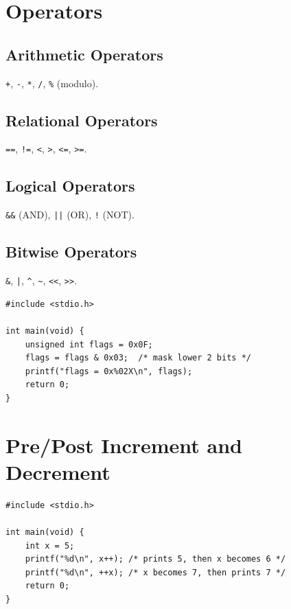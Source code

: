 \documentclass[11pt,a4paper]{article}
\begin{document}
\section{Operators}
\subsection{Arithmetic Operators}
\texttt{+}, \texttt{-}, \texttt{*}, \texttt{/}, \texttt{\%} (modulo).

\subsection{Relational Operators}
\texttt{==}, \texttt{!=}, \texttt{<}, \texttt{>}, \texttt{<=}, \texttt{>=}.

\subsection{Logical Operators}
\texttt{\&\&} (AND), \texttt{||} (OR), \texttt{!} (NOT).

\subsection{Bitwise Operators}
\texttt{\&}, \texttt{|}, \texttt{\^}, \texttt{\~}, \texttt{<<}, \texttt{>>}.

\begin{lstlisting}
#include <stdio.h>

int main(void) {
    unsigned int flags = 0x0F;
    flags = flags & 0x03;  /* mask lower 2 bits */
    printf("flags = 0x%02X\n", flags);
    return 0;
}
\end{lstlisting}

\section{Pre/Post Increment and Decrement}
\begin{lstlisting}
#include <stdio.h>

int main(void) {
    int x = 5;
    printf("%d\n", x++); /* prints 5, then x becomes 6 */
    printf("%d\n", ++x); /* x becomes 7, then prints 7 */
    return 0;
}
\end{lstlisting}
\end{document}
